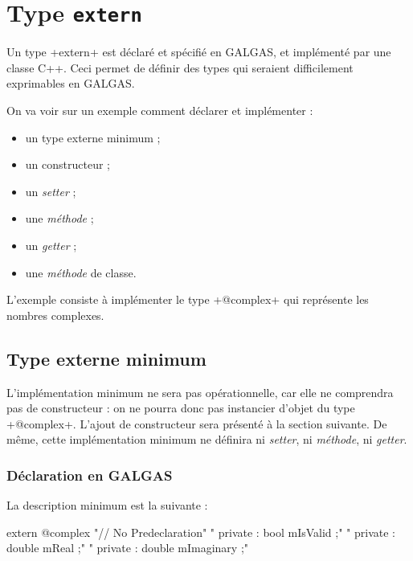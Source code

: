 
\chapter{Type \texttt{extern}}


Un type \ggs+extern+ est déclaré et spécifié en GALGAS, et implémenté par une classe C++. Ceci permet de définir des types qui seraient difficilement exprimables en GALGAS.

On va voir sur un exemple comment déclarer et implémenter :
\begin{itemize}
  \item un type externe minimum ;
  \item un constructeur ;
  \item un \emph{setter} ;
  \item une \emph{méthode} ;
  \item un \emph{getter} ;
  \item une \emph{méthode} de classe.
\end{itemize}

L'exemple consiste à implémenter le type \ggs+@complex+ qui représente les nombres complexes.

\section{Type externe minimum}

L'implémentation minimum ne sera pas opérationnelle, car elle ne comprendra pas de constructeur : on ne pourra donc pas instancier d'objet du type \ggs+@complex+. L'ajout de constructeur sera présenté à la section suivante. De même, cette implémentation minimum ne définira ni \emph{setter}, ni \emph{méthode}, ni \emph{getter}.


\subsection{Déclaration en GALGAS}

La description minimum est la suivante :
\begin{galgascode}
extern @complex {
  "// No Predeclaration\n"
}{
  "  private : bool mIsValid ;\n"
  "  private : double mReal ;\n"
  "  private : double mImaginary ;\n"
}{
}
\end{galgascode}

